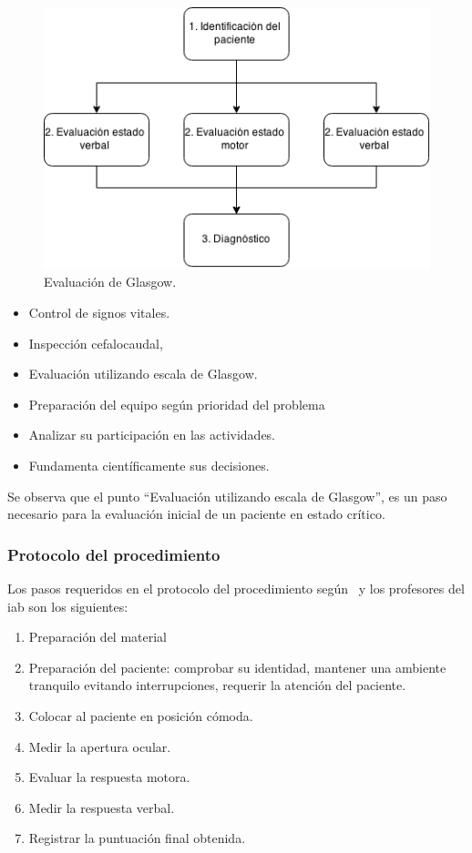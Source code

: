\begin{figure}
\centering
\includegraphics[scale=0.5]{requerimientos/images/glasgow.png}
\caption{Evaluación de Glasgow.}
\label{fig:proc_glasgow}
\end{figure}

\begin{itemize}
\item Control de signos vitales.
\item Inspección cefalocaudal, 
\item Evaluación utilizando escala de Glasgow.
\item Preparación del equipo según prioridad del problema
\item Analizar su participación en las actividades.
\item Fundamenta científicamente sus decisiones.
\end{itemize}

Se observa que el punto \enquote{Evaluación utilizando escala de Glasgow}, es un
paso necesario para la evaluación inicial de un paciente en estado crítico.

\subsubsection{Protocolo del procedimiento}
\label{sec:glasgow_protocolo}

Los pasos requeridos en el protocolo del procedimiento según~\cite{protocolo} y los 
profesores del \Gls{iab} son los siguientes:

\begin{enumerate}
\item Preparación del material
\item Preparación del paciente: comprobar su identidad, mantener una ambiente
    tranquilo evitando interrupciones, requerir la atención del paciente.
\item Colocar al paciente en posición cómoda.
\item Medir la apertura ocular.
\item Evaluar la respuesta motora.
\item Medir la respuesta verbal.
\item Registrar la puntuación final obtenida.
\end{enumerate}
